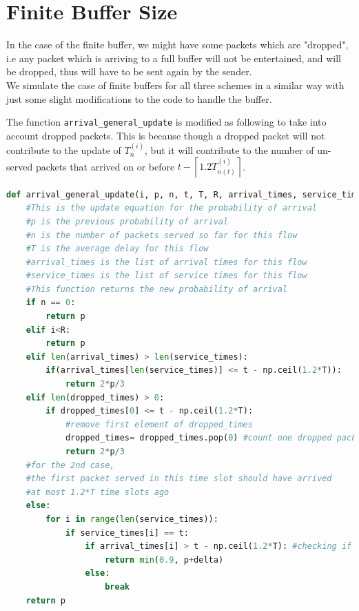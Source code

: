 \documentclass[11pt, a4paper]{article}
\begin{document}
\section{Finite Buffer Size}
In the case of the finite buffer, we might have some packets which are "dropped", i.e any packet which is arriving to a full buffer will not be entertained, and will be dropped, thus will have to be sent again by the sender. \\

We simulate the case of finite buffers for all three schemes in a similar way with just some slight modifications to the code to handle the buffer.

The function \texttt{arrival{\_}general{\_}update} is modified as following to take into account dropped packets. This is because though a dropped packet will not contribute to the update of $T_n^{(i)}$, but it will contribute to the number of un-served packets that arrived on or before $t-\left\lceil 1.2 T_{n(t)}^{(i)}\right\rceil$.

\begin{lstlisting}[language=Python]
def arrival_general_update(i, p, n, t, T, R, arrival_times, service_times, delta, dropped_times):
    #This is the update equation for the probability of arrival
    #p is the previous probability of arrival
    #n is the number of packets served so far for this flow
    #T is the average delay for this flow
    #arrival_times is the list of arrival times for this flow
    #service_times is the list of service times for this flow
    #This function returns the new probability of arrival
    if n == 0:
        return p
    elif i<R:
        return p
    elif len(arrival_times) > len(service_times):
        if(arrival_times[len(service_times)] <= t - np.ceil(1.2*T)):
            return 2*p/3
    elif len(dropped_times) > 0:
        if dropped_times[0] <= t - np.ceil(1.2*T):
            #remove first element of dropped_times
            dropped_times= dropped_times.pop(0) #count one dropped packet only once
            return 2*p/3
    #for the 2nd case,
    #the first packet served in this time slot should have arrived 
    #at most 1.2*T time slots ago
    else:
        for i in range(len(service_times)):
            if service_times[i] == t:
                if arrival_times[i] > t - np.ceil(1.2*T): #checking if the served packet arrived in the last 1.2*T time slots
                    return min(0.9, p+delta)
                else:
                    break
    return p
\end{lstlisting}
\end{document}
